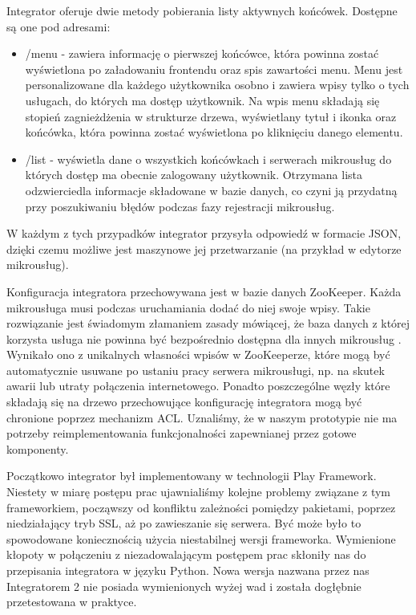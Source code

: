 \documentclass[licencjacka]{pracamgr}
\begin{document}
Integrator oferuje dwie metody pobierania listy aktywnych końcówek. Dostępne są
one pod adresami:
\begin{itemize}
	\item /menu - zawiera informację o pierwszej końcówce, która powinna zostać
	wyświetlona po załadowaniu frontendu oraz spis zawartości menu. Menu jest
	personalizowane dla każdego użytkownika osobno i zawiera wpisy tylko o tych
	usługach, do których ma dostęp użytkownik. Na wpis menu składają się stopień
	zagnieżdżenia w strukturze drzewa, wyświetlany tytuł i ikonka oraz końcówka,
	która powinna zostać wyświetlona po kliknięciu danego elementu.
	\item /list - wyświetla dane o wszystkich końcówkach i serwerach mikrousług
	do których dostęp ma obecnie zalogowany użytkownik. Otrzymana lista odzwierciedla
	informacje składowane w bazie danych, co czyni ją przydatną przy poszukiwaniu
	błędów podczas fazy rejestracji mikrousług.
\end{itemize}
W każdym z tych przypadków integrator przysyła odpowiedź w formacie JSON, dzięki
czemu możliwe jest maszynowe jej przetwarzanie (na przykład w edytorze mikrousług).

Konfiguracja integratora przechowywana jest w bazie danych ZooKeeper. Każda
mikrousługa musi podczas uruchamiania dodać do niej swoje wpisy. Takie rozwiązanie
jest świadomym złamaniem zasady mówiącej, że baza danych z której korzysta usługa
nie powinna być bezpośrednio dostępna dla innych mikrousług \cite{microsvc}.
Wynikało ono z unikalnych własności wpisów w ZooKeeperze, które mogą być automatycznie
usuwane po ustaniu pracy serwera mikrousługi, np. na skutek awarii lub utraty
połączenia internetowego. Ponadto poszczególne węzły które składają się na drzewo
przechowujące konfigurację integratora mogą być chronione poprzez mechanizm ACL.
Uznaliśmy, że w naszym prototypie nie ma potrzeby reimplementowania funkcjonalności
zapewnianej przez gotowe komponenty.

Początkowo integrator był implementowany w technologii Play Framework. Niestety
w miarę postępu prac ujawnialiśmy kolejne problemy związane z tym frameworkiem,
począwszy od konfliktu zależności pomiędzy pakietami, poprzez niedziałający tryb
SSL, aż po zawieszanie się serwera. Być może było to spowodowane koniecznością
użycia niestabilnej wersji frameworka. Wymienione kłopoty w połączeniu z niezadowalającym
postępem prac skłoniły nas do przepisania integratora w języku Python. Nowa wersja
nazwana przez nas Integratorem 2 nie posiada wymienionych wyżej wad i została
dogłębnie przetestowana w praktyce.
\end{document}
